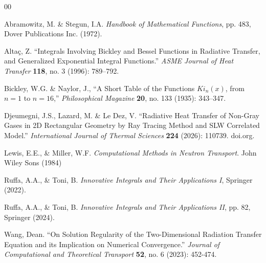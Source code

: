 \documentclass[pdflatex,sn-mathphys-num]{sn-jnl}%
\theoremstyle{thmstyleone}%
\theoremstyle{thmstyletwo}%
\theoremstyle{thmstylethree}%
\begin{document}
\begin{thebibliography}{00}

Abramowitz, M. \& Stegun, I.A. \emph{Handbook of Mathematical Functions}, pp. 483, Dover Publications Inc. (1972).

 Altaç, Z. ``Integrals Involving Bickley and Bessel Functions in Radiative Transfer, and Generalized Exponential Integral Functions.'' \emph{ASME Journal of Heat Transfer} \textbf{118}, no. 3 (1996): 789–792.

 Bickley, W.G. \& Naylor, J., ``A Short Table of the Functions $Ki_n(x)$, from $n=1$ to $n=16$,'' \emph{Philosophical Magazine} \textbf{20}, no. 133 (1935): 343--347.


 Djeumegni, J.S., Lazard, M. \& Le Dez, V. ``Radiative Heat Transfer of Non-Gray Gases in 2D Rectangular Geometry by Ray Tracing Method and SLW Correlated Model.'' \emph{International Journal of Thermal Sciences} \textbf{224} (2026): 110739. doi.org.

Lewis, E.E., \& Miller, W.F. \emph{Computational Methods in Neutron Transport}. John Wiley Sons (1984)

 Ruffa, A.A., \& Toni, B. \emph{Innovative Integrals and Their Applications I}, Springer (2022).

 Ruffa, A.A., \& Toni, B. \emph{Innovative Integrals and Their Applications II}, pp. 82, Springer (2024).

Wang, Dean. ``On Solution Regularity of the Two-Dimensional Radiation Transfer Equation and its Implication on Numerical Convergence.'' \emph{Journal of Computational and Theoretical Transport} \textbf{52}, no. 6 (2023): 452-474.

\end{thebibliography}
\end{document}

